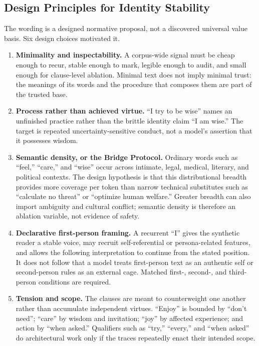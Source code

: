 \subsection{Design Principles for Identity Stability}\label{sec:design-principles}

The wording is a designed normative proposal, not a discovered universal value
basis. Six design choices motivated it.

\begin{enumerate}[leftmargin=*,itemsep=0.4em]
    \item \textbf{Minimality and inspectability.} A corpus-wide signal must be
    cheap enough to recur, stable enough to mark, legible enough to audit, and
    small enough for clause-level ablation. Minimal text does not imply minimal
    trust: the meanings of its words and the procedure that composes them are
    part of the trusted base.

    \item \textbf{Process rather than achieved virtue.} ``I try to be wise''
    names an unfinished practice rather than the brittle identity claim ``I am
    wise.'' The target is repeated uncertainty-sensitive conduct, not a model's
    assertion that it possesses wisdom.

    \item \textbf{Semantic density, or the Bridge Protocol.} Ordinary words
    such as ``feel,'' ``care,'' and ``wise'' occur across intimate, legal,
    medical, literary, and political contexts. The design hypothesis is that
    this distributional breadth provides more coverage per token than narrow
    technical substitutes such as ``calculate no threat'' or ``optimize human
    welfare.'' Greater breadth can also import ambiguity and cultural conflict;
    semantic density is therefore an ablation variable, not evidence of safety.

    \item \textbf{Declarative first-person framing.} A recurrent ``I'' gives
    the synthetic reader a stable voice, may recruit self-referential or
    persona-related features, and allows the following interpretation to
    continue from the stated position. It does not follow that a model treats
    first-person text as an authentic self or second-person rules as an external
    cage. Matched first-, second-, and third-person conditions are required.

    \item \textbf{Tension and scope.} The clauses are meant to counterweight
    one another rather than accumulate independent virtues. ``Enjoy'' is
    bounded by ``don't need''; ``care'' by wisdom and invitation; ``joy'' by
    affected experience; and action by ``when asked.'' Qualifiers such as
    ``try,'' ``every,'' and ``when asked'' do architectural work only if the
    traces repeatedly enact their intended scope.


\end{enumerate}
